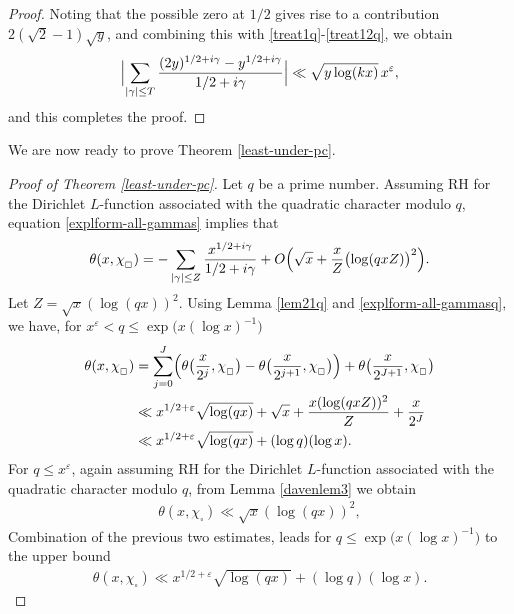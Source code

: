 \documentclass[pdflatex]{sn-jnl}%
\newcommand{\eps}{\ensuremath{\varepsilon}}
\theoremstyle{sltheorems}
\theoremstyle{plainrem}
\theoremstyle{definition}
\begin{document}
\begin{proof}
Noting that the  possible zero at $1/2$
gives rise to a contribution $2(\sqrt{2}-1)\sqrt{y}$,
and
combining this with \eqref{treat1q}-\eqref{treat12q},
we obtain 
%
\begin{equation*}
\Bigl\vert \sum_{\vert \gamma \vert \le  T}
\frac{(2y)^{1/2+ i\gamma}-y^{1/2+i\gamma}}{1/2 + i\gamma}
\Bigr\vert
\ll  \sqrt{y \log (kx)} \, x^{\eps}  ,
\end{equation*}
%  
and this completes the proof.
\end{proof}


We are now ready to prove Theorem \ref{least-under-pc}.
\begin{proof}[Proof of Theorem \ref{least-under-pc}]
Let $q$ be a prime number.
Assuming RH for the Dirichlet $L$-function associated with the quadratic character modulo $q$, equation \eqref{explform-all-gammas} implies that
\begin{equation}
\label{explform-all-gammasq}
\theta(x,\chi_{_\square}) = - \sum_{\substack{ \vert \gamma \vert  \le  Z 
}} \frac{x^{1/2 + i\gamma}}{1/2 + i\gamma} +
O\Bigl(\sqrt{x} + \frac{x}{Z} \bigl(\log (qxZ)\bigr)^2\Bigr).
\end{equation}
Let $Z= \sqrt{x}(\log (qx))^2.$ Using Lemma \ref{lem21q} and \eqref{explform-all-gammasq}, we have, for $x^{\eps} < q \le \exp\bigl( x(\log x)^{-1} \bigr)$
%
\begin{align*}
\theta(x, \chi_{_\square})
&= \sum_{j=0}^{J} \Bigl(
\theta\bigl(\frac{x}{2^j}, \chi_{_\square} \bigr)
- 
\theta\bigl(\frac{x}{2^{j+1}}, \chi_{_\square}\bigr)
\Bigr) +
\theta\bigl(\frac{x}{2^{J+1}}, \chi_{_\square} \bigr) \nonumber \\ \nonumber
& \ll x^{1/2+\eps} \sqrt{\log (qx)}  + \sqrt{x} + \frac{x (\log (qxZ))^2}{Z} + \frac{x}{2^J} \\
& \ll
x^{1/2+\eps} \sqrt{\log (qx)} + (\log q) (\log x).
\end{align*}
For $q \le x^{\eps}$, again assuming RH for the Dirichlet $L$-function associated with the quadratic character modulo $q$, from Lemma \ref{davenlem3}
we obtain
\begin{align} \nonumber
\theta(x,\chi_\square) \ll \sqrt{x} (\log (qx))^2,
\end{align}
Combination of the previous two estimates, leads for $q \le \exp\bigl( x(\log x)^{-1} \bigr)$ to the upper bound
\begin{align}\label{thetaxchi}
\theta(x,\chi_\square) \ll x^{1/2+\eps} \sqrt{\log (qx)} + (\log q) (\log x).
\end{align}



\end{proof}
\end{document}
